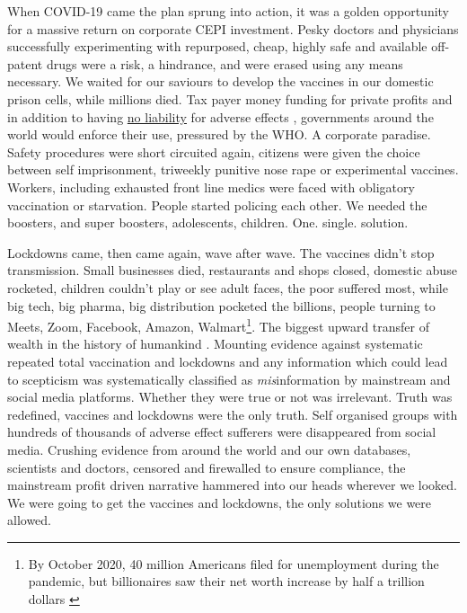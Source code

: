 \documentclass[11pt,a4paper,notitlepage]{report}
\begin{document}
When COVID-19 came the plan sprung into action, it was a golden opportunity for a massive return on corporate CEPI investment. Pesky doctors and physicians successfully experimenting with repurposed, cheap, highly safe and available off-patent drugs were a risk, a hindrance, and were erased using any means necessary. We waited for our saviours to develop the vaccines in our domestic prison cells, while millions died. Tax payer money funding for private profits and in addition to having \href{https://www.cnbc.com/2020/12/16/covid-vaccine-side-effects-compensation-lawsuit.html}{no liability} for adverse effects \cite{cnbc17122020}, governments around the world would enforce their use, pressured by the WHO. A corporate paradise. Safety procedures were short circuited again, citizens were given the choice between self imprisonment, triweekly punitive nose rape or experimental vaccines. Workers, including exhausted front line medics were faced with obligatory vaccination or starvation. People started policing each other. We needed the boosters, and super boosters, adolescents, children. One. single. solution.

Lockdowns came, then came again, wave after wave. The vaccines didn't stop transmission. Small businesses died, restaurants and shops closed, domestic abuse rocketed, children couldn't play or see adult faces, the poor suffered most, while big tech, big pharma, big distribution pocketed the billions, people turning to Meets, Zoom, Facebook, Amazon, Walmart\footnote{By October 2020, 40 million Americans filed for unemployment during the pandemic, but billionaires saw their net worth increase by half a trillion dollars \cite{businessinsider30102020}}. The biggest upward transfer of wealth in the history of humankind \cite{oxfam17012022}. Mounting evidence against systematic repeated total vaccination and lockdowns and any information which could lead to scepticism was systematically classified as \textit{mis}information by mainstream and social media platforms. Whether they were true or not was irrelevant. Truth was redefined, vaccines and lockdowns were the only truth. Self organised groups with hundreds of thousands of adverse effect sufferers were disappeared from social media. Crushing evidence from around the world and our own databases, scientists and doctors, censored and firewalled to ensure compliance, the mainstream profit driven narrative hammered into our heads wherever we looked. We were going to get the vaccines and lockdowns, the only solutions we were allowed.
\end{document}
